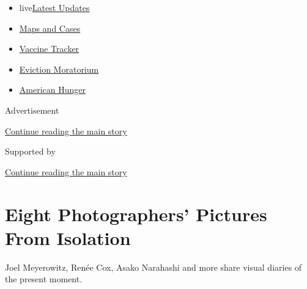 \begin{itemize}
\tightlist
\item
  live\href{https://www.nytimes3xbfgragh.onion/2020/09/08/world/covid-19-coronavirus.html?name=styln-coronavirus-national\&region=TOP_BANNER\&block=storyline_menu_recirc\&action=click\&pgtype=Article\&impression_id=f7604421-f278-11ea-9a9f-018759a6103d\&variant=undefined}{Latest
  Updates}
\item
  \href{https://www.nytimes3xbfgragh.onion/interactive/2020/us/coronavirus-us-cases.html?name=styln-coronavirus-national\&region=TOP_BANNER\&block=storyline_menu_recirc\&action=click\&pgtype=Article\&impression_id=f7604422-f278-11ea-9a9f-018759a6103d\&variant=undefined}{Maps
  and Cases}
\item
  \href{https://www.nytimes3xbfgragh.onion/interactive/2020/science/coronavirus-vaccine-tracker.html?name=styln-coronavirus-national\&region=TOP_BANNER\&block=storyline_menu_recirc\&action=click\&pgtype=Article\&impression_id=f7604423-f278-11ea-9a9f-018759a6103d\&variant=undefined}{Vaccine
  Tracker}
\item
  \href{https://www.nytimes3xbfgragh.onion/2020/09/02/your-money/eviction-moratorium-covid.html?name=styln-coronavirus-national\&region=TOP_BANNER\&block=storyline_menu_recirc\&action=click\&pgtype=Article\&impression_id=f7604424-f278-11ea-9a9f-018759a6103d\&variant=undefined}{Eviction
  Moratorium}
\item
  \href{https://www.nytimes3xbfgragh.onion/interactive/2020/09/02/magazine/food-insecurity-hunger-us.html?name=styln-coronavirus-national\&region=TOP_BANNER\&block=storyline_menu_recirc\&action=click\&pgtype=Article\&impression_id=f7606b30-f278-11ea-9a9f-018759a6103d\&variant=undefined}{American
  Hunger}
\end{itemize}

Advertisement

\protect\hyperlink{after-top}{Continue reading the main story}

Supported by

\protect\hyperlink{after-sponsor}{Continue reading the main story}

\hypertarget{eight-photographers-pictures-from-isolation}{%
\section{Eight Photographers' Pictures From
Isolation}\label{eight-photographers-pictures-from-isolation}}

Joel Meyerowitz, Renée Cox, Asako Narahashi and more share visual
diaries of the present moment.

